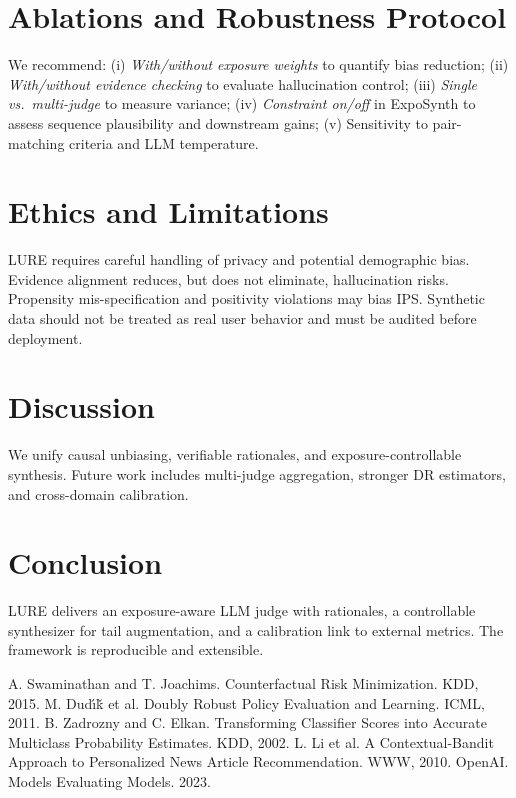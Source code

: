 \documentclass[10pt]{article}
\begin{document}
\section{Ablations and Robustness Protocol}
We recommend: (i) \emph{With/without exposure weights} to quantify bias reduction; (ii) \emph{With/without evidence checking} to evaluate hallucination control; (iii) \emph{Single vs.~multi-judge} to measure variance; (iv) \emph{Constraint on/off} in ExpoSynth to assess sequence plausibility and downstream gains; (v) Sensitivity to pair-matching criteria and LLM temperature.

\section{Ethics and Limitations}
LURE requires careful handling of privacy and potential demographic bias. Evidence alignment reduces, but does not eliminate, hallucination risks. Propensity mis-specification and positivity violations may bias IPS. Synthetic data should not be treated as real user behavior and must be audited before deployment.

\section{Discussion}
We unify causal unbiasing, verifiable rationales, and exposure-controllable synthesis. Future work includes multi-judge aggregation, stronger DR estimators, and cross-domain calibration.

\section{Conclusion}
LURE delivers an exposure-aware LLM judge with rationales, a controllable synthesizer for tail augmentation, and a calibration link to external metrics. The framework is reproducible and extensible.


\begin{thebibliography}{9}
 A. Swaminathan and T. Joachims. Counterfactual Risk Minimization. KDD, 2015.
 M. Dud\'\i\v{k} et al. Doubly Robust Policy Evaluation and Learning. ICML, 2011.
 B. Zadrozny and C. Elkan. Transforming Classifier Scores into Accurate Multiclass Probability Estimates. KDD, 2002.
 L. Li et al. A Contextual-Bandit Approach to Personalized News Article Recommendation. WWW, 2010.
 OpenAI. Models Evaluating Models. 2023.
\end{thebibliography}
\end{document}
